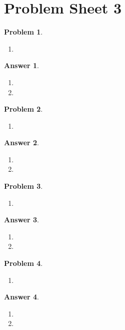 \documentclass[a4paper]{article}
\newtheorem{ans}{Answer}[subsection]
\theoremstyle{new}
\newtheorem{qns}{Problem}[section]
\begin{document}
\section{Problem Sheet 3}
\begin{qns}\leavevmode
\begin{enumerate}[label=(\alph*)]
\item 

\end{enumerate}
\end{qns}
\begin{ans}\leavevmode
\begin{enumerate}[label=(\alph*)]
\item

\item 
\end{enumerate}
\end{ans}
\begin{qns}\leavevmode
\begin{enumerate}[label=(\alph*)]
\item 

\end{enumerate}
\end{qns}
\begin{ans}\leavevmode
\begin{enumerate}[label=(\alph*)]
\item

\item 
\end{enumerate}
\end{ans}
\newpage
\begin{qns}\leavevmode
\begin{enumerate}[label=(\alph*)]
\item 

\end{enumerate}
\end{qns}
\begin{ans}\leavevmode
\begin{enumerate}[label=(\alph*)]
\item

\item 
\end{enumerate}
\end{ans}
\begin{qns}\leavevmode
\begin{enumerate}[label=(\alph*)]
\item 

\end{enumerate}
\end{qns}
\begin{ans}\leavevmode
\begin{enumerate}[label=(\alph*)]
\item

\item 
\end{enumerate}
\end{ans}
\newpage
\end{document}
